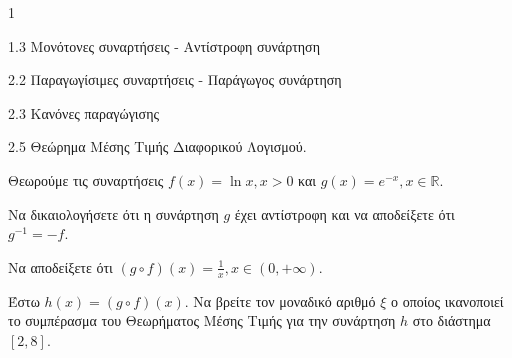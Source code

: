 \begin{ylh}{1}
    \item 1.3 Μονότονες συναρτήσεις - Αντίστροφη συνάρτηση
    \item 2.2 Παραγωγίσιμες συναρτήσεις - Παράγωγος συνάρτηση
    \item 2.3 Κανόνες παραγώγισης
    \item 2.5 Θεώρημα Μέσης Τιμής Διαφορικού Λογισμού.
\end{ylh}
Θεωρούμε τις συναρτήσεις $f(x) = \ln x, x > 0$ και $g(x) = e^{-x}, x \in \mathbb{R}$.
\begin{alist}
    \item Να δικαιολογήσετε ότι η συνάρτηση $g$ έχει αντίστροφη και να αποδείξετε ότι $g^{-1} = -f$. 
    \item Να αποδείξετε ότι $(g \circ f)(x) = \frac{1}{x}, x \in (0, +\infty)$. 
    \item Έστω $h(x) = (g \circ f)(x)$. Να βρείτε τον μοναδικό αριθμό $\xi$ ο οποίος ικανοποιεί το συμπέρασμα του Θεωρήματος Μέσης Τιμής για την συνάρτηση $h$ στο διάστημα $[2, 8]$. 
\end{alist}